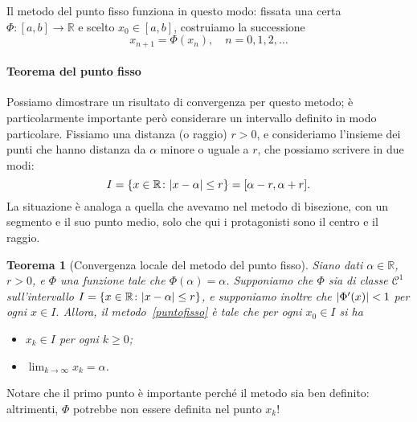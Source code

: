 \documentclass[a4paper]{report}
\DeclarePairedDelimiter{\abs}{\lvert}{\rvert}
\newtheorem{theorem}{Teorema}[chapter]
\theoremstyle{definiton}
\theoremstyle{remark}
\begin{document}
Il metodo del punto fisso funziona in questo modo: fissata una certa $\Phi:[a,b] \to \mathbb{R}$ e scelto $x_0 \in [a,b]$, costruiamo la successione
\begin{equation} \label{puntofisso}
    x_{n+1} = \Phi(x_n), \quad n=0,1,2,\dots    
\end{equation}

\paragraph{Teorema del punto fisso} Possiamo dimostrare un risultato di convergenza per questo metodo; è particolarmente importante però considerare un intervallo definito in modo particolare. Fissiamo una distanza (o raggio) $r>0$, e consideriamo l'insieme dei punti che hanno distanza da $\alpha$ minore o uguale a $r$, che possiamo scrivere in due modi:
\[
    I = \{x\in\mathbb{R} \colon \abs{x-\alpha} \leq r\} = [\alpha-r, \alpha + r].
\]
La situazione è analoga a quella che avevamo nel metodo di bisezione, con un segmento e il suo punto medio, solo che qui i protagonisti sono il centro e il raggio.

\begin{center}
\end{center}


\begin{theorem}[Convergenza locale del metodo del punto fisso]\label{thm:puntofisso}
Siano dati $\alpha\in\mathbb{R}$, $r>0$, e $\Phi$ una funzione tale che $\Phi(\alpha)=\alpha$. Supponiamo che $\Phi$ sia di classe $\mathcal{C}^1$ sull'intervallo $I = \{x\in\mathbb{R} \colon \abs{x-\alpha} \leq r\}$, e supponiamo inoltre che $\abs{\Phi'(x)}<1$ per ogni $x\in I$. Allora, il metodo~\eqref{puntofisso} è tale che per ogni $x_0 \in I$ si ha
\begin{itemize}
    \item $x_k \in I$ per ogni $k \geq 0$;
    \item $\lim_{k\to\infty} x_k = \alpha$.
\end{itemize}
\end{theorem}
Notare che il primo punto è importante perché il metodo sia ben definito: altrimenti, $\Phi$ potrebbe non essere definita nel punto $x_k$!
\end{document}
